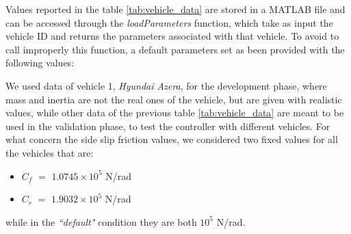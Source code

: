 \begin{table}[H]
\caption{Vehicle data considered for development and validation}
\label{tab:vehicle_data}
\end{table}
Values reported in the table \ref{tab:vehicle_data} are stored in a MATLAB file and can be accessed through the \textit{loadParameters} function, which take as input the vehicle ID and returns the parameters associated with that vehicle. To avoid to call improperly this function, a default parameters set as been provided with the following values:
\begin{table}[H]
\end{table}
We used data of vehicle 1, \textit{Hyundai Azera}, for the development phase, where mass and inertia are not the real ones of the vehicle, but are given with realistic values, while other data of the previous table \ref{tab:vehicle_data} are meant to be used in the validation phase, to test the controller with different vehicles.
For what concern the side slip friction values, we considered two fixed values for all the vehicles that are:
\begin{itemize}
    \item $C_f$ $=$ $1.0745\times10^5$ N/rad
    \item $C_r$ $=$ $1.9032\times10^5$ N/rad
\end{itemize}
while in the \textit{``default"} condition they are both $10^5$ N/rad.

